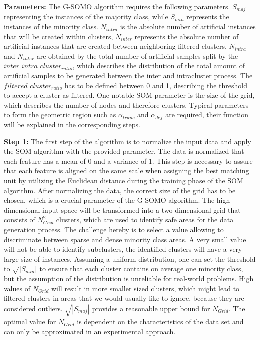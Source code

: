 \documentclass[parskip=full]{scrartcl}
\begin{document}
\textbf{\underline{Parameters:}} The G-SOMO algorithm requires the following parameters. $S_{maj}$ representing the instances of the majority class, while $S_{min}$ represents the instances of the minority class. $N_{intra}$ is the absolute number of artificial instances that will be created within clusters, $N_{inter}$ represents the absolute number of artificial instances that are created between neighboring filtered clusters. $N_{intra}$ and $N_{inter}$ are obtained by the total number of artificial samples split by the $inter\_intra\_cluster_{ratio}$, which describes the distribution of the total amount of artificial samples to be generated between the inter and intracluster process. The $filtered\_cluster_{ratio}$ has to be defined between 0 and 1, describing the threshold to accept a cluster as filtered. One notable SOM parameter is the size of the grid, which describes the number of nodes and therefore clusters. Typical parameters to form the geometric region such as $\alpha_{trunc}$ and $\alpha_{def}$ are required, their function will be explained in the corresponding steps. 

\textbf{\underline{Step 1:}} The first step of the algorithm is to normalize the input data and apply the SOM algorithm with the provided parameter. The data is normalized that each feature has a mean of 0 and a variance of 1.  This step is necessary to assure that each feature is aligned on the same scale when assigning the best matching unit by utilizing the Euclidean distance during the training phase of the SOM algorithm. After normalizing the data, the correct size of the grid has to be chosen, which is a crucial parameter of the G-SOMO algorithm. The high dimensional input space will be transformed into a two-dimensional grid that consists of $N_{Grid}^2$ clusters, which are used to identify safe areas for the data generation process. The challenge hereby is to select a value allowing to discriminate between sparse and dense minority class areas.  A very small value will not be able to identify subclusters, the identified clusters will have a very large size of instances. Assuming a uniform distribution, one can set the threshold to  $\sqrt{|S_{min}|}$ to ensure that each cluster contains on average one minority class,  but the assumption of the distribution is unreliable for real-world problems. High values of $N_{Grid}$ will result in more smaller sized clusters, which might lead to filtered clusters in areas that we would usually like to ignore, because they are considered outliers. $\sqrt{|S_{maj}|}$ provides a reasonable upper bound for $N_{Grid}$. The optimal value for $N_{Grid}$ is dependent on the characteristics of the data set and can only be approximated in an experimental approach.
\end{document}
